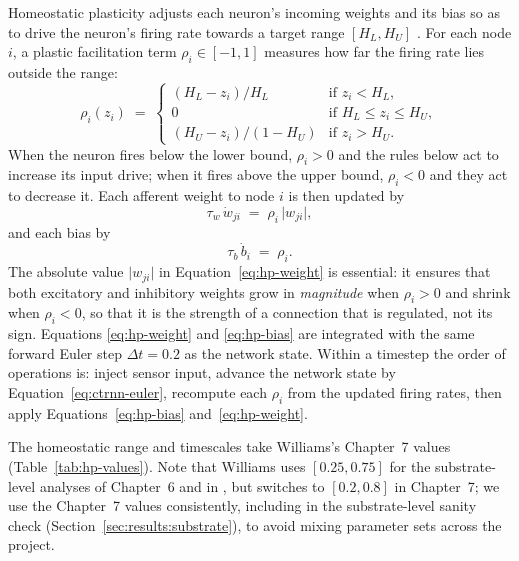Homeostatic plasticity adjusts each neuron's incoming weights and its bias so as
to drive the neuron's firing rate towards a target range $[H_L, H_U]$
\parencite{dipaolo2000, williams2006}. For each node $i$, a plastic facilitation
term $\rho_i \in [-1, 1]$ measures how far the firing rate lies outside the
range:
%
\begin{equation}
  \rho_i(z_i) \;=\;
  \begin{cases}
    (H_L - z_i)/H_L & \text{if } z_i < H_L, \\[2pt]
    0 & \text{if } H_L \le z_i \le H_U, \\[2pt]
    (H_U - z_i)/(1 - H_U) & \text{if } z_i > H_U.
  \end{cases}
  \label{eq:rho}
\end{equation}
%
When the neuron fires below the lower bound, $\rho_i > 0$ and the rules below act
to increase its input drive; when it fires above the upper bound, $\rho_i < 0$
and they act to decrease it. Each afferent weight to node $i$ is then updated by
%
\begin{equation}
  \tau_w\, \dot{w}_{ji} \;=\; \rho_i\, \lvert w_{ji} \rvert,
  \label{eq:hp-weight}
\end{equation}
%
and each bias by
%
\begin{equation}
  \tau_b\, \dot{b}_i \;=\; \rho_i.
  \label{eq:hp-bias}
\end{equation}
%
The absolute value $\lvert w_{ji} \rvert$ in Equation~\ref{eq:hp-weight} is
essential: it ensures that both excitatory and inhibitory weights grow in
\emph{magnitude} when $\rho_i > 0$ and shrink when $\rho_i < 0$, so that it is
the strength of a connection that is regulated, not its sign. Equations
\ref{eq:hp-weight} and \ref{eq:hp-bias} are integrated with the same forward
Euler step $\Delta t = 0.2$ as the network state. Within a timestep the order of
operations is: inject sensor input, advance the network state by
Equation~\ref{eq:ctrnn-euler}, recompute each $\rho_i$ from the updated firing
rates, then apply Equations~\ref{eq:hp-bias} and~\ref{eq:hp-weight}.

The homeostatic range and timescales take Williams's Chapter~7 values
(Table~\ref{tab:hp-values}). Note that Williams uses $[0.25, 0.75]$ for the
substrate-level analyses of Chapter~6 and in \textcite{williamsnoble2007}, but
switches to $[0.2, 0.8]$ in Chapter~7; we use the Chapter~7 values consistently,
including in the substrate-level sanity check
(Section~\ref{sec:results:substrate}), to avoid mixing parameter sets across the
project.


